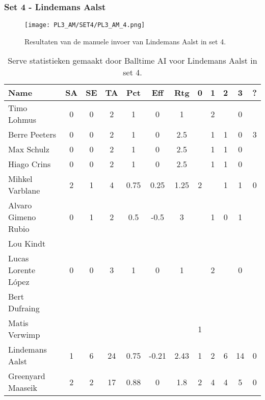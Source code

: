 \subsubsection{Set 4 - Lindemans Aalst}
\label{sec:PL3_Aalst4}
\begin{figure}
  \centering
  \texttt{[image: PL3\_AM/SET4/PL3\_AM\_4.png]}
  \caption{\label{fig:PL3_AM_4}Resultaten van de manuele invoer van Lindemans Aalst in set 4.}
\end{figure}

\begin{table}[ht!]
  \centering
  \scriptsize
  \begin{tabular}{|l|c|c|c|c|c|c|c|c|c|c|c|} \hline
    \textbf{Name} & SA & SE & TA & Pct & Eff & Rtg & 0 & 1 & 2 & 3 & ? \\ \hline
    Timo Lohmus & 0 & 0 & 2 & 1 & 0 & 1 &   & 2 &   & 0 &   \\
    Berre Peeters & 0 & 0 & 2 & 1 & 0 & 2.5 &   & 1 & 1 & 0 & 3 \\
    Max Schulz & 0 & 0 & 2 & 1 & 0 & 2.5 &   & 1 & 1 & 0 &   \\
    Hiago Crins & 0 & 0 & 2 & 1 & 0 & 2.5 &   & 1 & 1 & 0 &   \\
    Mihkel Varblane & 2 & 1 & 4 & 0.75 & 0.25 & 1.25 & 2 &   & 1 & 1 & 0 \\
    Alvaro Gimeno Rubio & 0 & 1 & 2 & 0.5 & -0.5 & 3 &   & 1 & 0 & 1 &   \\
    Lou Kindt &   &   &   &   &   &   &   &   &   &   &   \\
    Lucas Lorente López & 0 & 0 & 3 & 1 & 0 & 1 &   & 2 &   & 0 &   \\
    Bert Dufraing &   &   &   &   &   &   &   &   &   &   &   \\
    Matis Verwimp &   &   &   &   &   &   & 1 &   &   &   &   \\
    Lindemans Aalst & 1 & 6 & 24 & 0.75 & -0.21 & 2.43 & 1 & 2 & 6 & 14 & 0 \\
    Greenyard Maaseik & 2 & 2 & 17 & 0.88 & 0 & 1.8 & 2 & 4 & 4 & 5 & 0 \\ \hline
  \end{tabular}
  \caption[Serve statistieken gemaakt door Balltime AI voor Lindemans Aalst in set 4]{\label{tab:PL3ServeAalst4}Serve statistieken gemaakt door Balltime AI voor Lindemans Aalst in set 4.}
\end{table}

